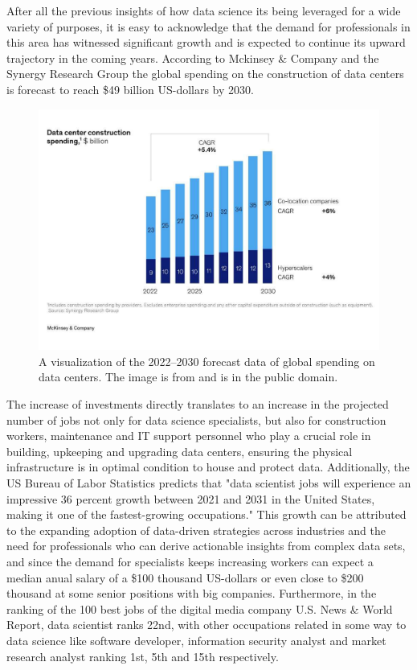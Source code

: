 \documentclass{vgtc}                          %
\begin{document}
After all the previous insights of how data science its being leveraged for a wide variety of purposes, it is easy to acknowledge that the demand for professionals in this area has 
witnessed significant growth and is expected to continue its upward trajectory in the coming years. According to Mckinsey \& Company and the Synergy Research Group the global spending 
on the construction of data centers is forecast to reach \$49 billion US-dollars by 2030.\cite{Bangalore:2023}
\begin{figure}[h]
  \centering %
  \includegraphics[width=\columnwidth]{datacenter_spending}
  \caption{A visualization of the 2022--2030 forecast data of global spending on data centers. The image is from \cite{Bangalore:2023} and is in the public domain.}
  \label{fig:sample}
\end{figure}

The increase of investments directly translates to an increase in the projected number of jobs not only for data science specialists, but also for construction workers, maintenance 
and IT support personnel who play a crucial role in building, upkeeping and upgrading data centers, ensuring the physical infrastructure is in optimal condition to house and protect data. 
Additionally, the US Bureau of Labor Statistics predicts that "data scientist jobs will experience an impressive 36 percent growth between 2021 and 2031 in the United States, making it one 
of the fastest-growing occupations."\cite{US-Bureau:2023} This growth can be attributed to the expanding adoption of data-driven strategies across industries and the need for professionals 
who can derive actionable insights from complex data sets, and since the demand for specialists keeps increasing workers can expect a median anual salary of a \$100 thousand US-dollars or 
even close to \$200 thousand at some senior positions with big companies. Furthermore, in the ranking of the 100 best jobs of the digital media company U.S. News \& World Report, data scientist 
ranks 22nd, with other occupations related in some way to data science like software developer, information security analyst and market research analyst ranking 1st, 5th and 15th respectively.\cite{US-News:2023}
\end{document}
